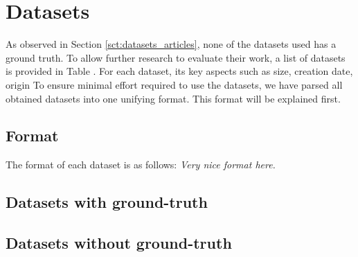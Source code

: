 \section{Datasets}
	As observed in Section \ref{sct:datasets_articles}, none of the datasets used has a ground truth.
	To allow further research to evaluate their work, a list of datasets is provided in Table .
	For each dataset, its key aspects such as size, creation date, origin 
	To ensure minimal effort required to use the datasets, we have parsed all obtained datasets into one unifying format.
	This format will be explained first.
	
	\subsection{Format}
		The format of each dataset is as follows:
		\emph{Very nice format here.} 
		
	\subsection{Datasets with ground-truth}
		
	
	\subsection{Datasets without ground-truth}
		